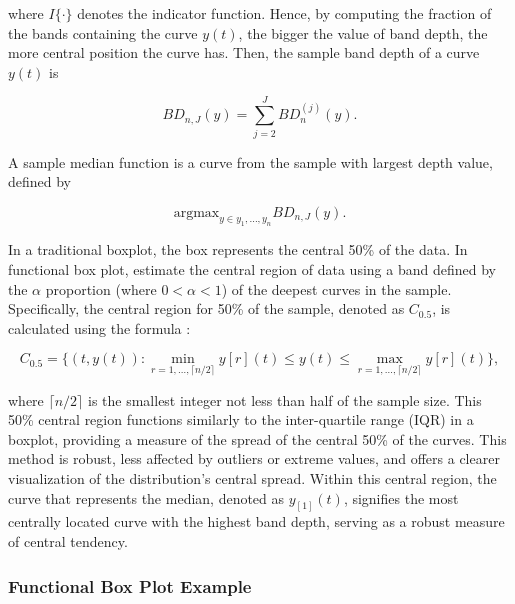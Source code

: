 \documentclass{article}\usepackage[]{graphicx}\usepackage[]{xcolor}
\numberwithin{equation}{section}
\begin{document}
\noindent
where $I\{·\}$ denotes the indicator function. Hence, by computing the fraction of the bands containing the curve $y(t)$, the bigger the value of band depth, the more central position the curve has. Then, the sample band depth of a curve $y(t)$ is \cite{SunGenton2011FunctionalBoxplots}

\[BD_{n,J}(y) = \sum_{j=2}^{J} BD^{(j)}_n (y).\]

\noindent
A sample median function is a curve from the sample with largest depth value, defined by \cite{SunGenton2011FunctionalBoxplots} 

\[\text{argmax}_{y \in {y_1,\dots,y_n}} BD_{n,J}(y).\]

\noindent
In a traditional boxplot, the box represents the central 50\% of the data.  In functional box plot, estimate the central region of data using a band defined by the $\alpha$ proportion (where $0 < \alpha < 1$) of the deepest curves in the sample. Specifically, the central region for 50\% of the sample, denoted as $C_{0.5}$, is calculated using the formula \cite{SunGenton2011FunctionalBoxplots}:

\[C_{0.5} = \{(t, y(t)) : \min_{r=1, \ldots, \lceil n/2 \rceil} y[r](t) \leq y(t) \leq \max_{r=1, \ldots, \lceil n/2 \rceil} y[r](t)\},\]

\noindent
where $\lceil n/2 \rceil$ is the smallest integer not less than half of the sample size. This 50\% central region functions similarly to the inter-quartile range (IQR) in a boxplot, providing a measure of the spread of the central 50\% of the curves. This method is robust, less affected by outliers or extreme values, and offers a clearer visualization of the distribution's central spread. Within this central region, the curve that represents the median, denoted as $y_{[1]}(t)$, signifies the most centrally located curve with the highest band depth, serving as a robust measure of central tendency.

\subsubsection{Functional Box Plot Example}
\end{document}
